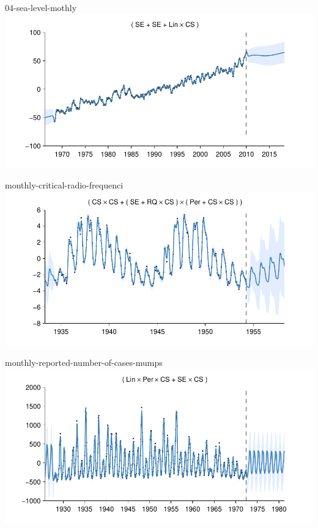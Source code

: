 \begin{frame}{04-sea-level-mothly}
  \center
  \includegraphics[width=1.0\textwidth]{figures/04-sea-level-mothly/04-sea-level-mothly_all}
\end{frame} 

\begin{frame}{monthly-critical-radio-frequenci}
  \center
  \includegraphics[width=1.0\textwidth]{figures/monthly-critical-radio-frequenci/monthly-critical-radio-frequenci_all}
\end{frame}

\begin{frame}{monthly-reported-number-of-cases-mumps}
  \center
  \includegraphics[width=1.0\textwidth]{figures/monthly-reported-number-of-cases-mumps/monthly-reported-number-of-cases-mumps_all}
\end{frame}  
    
